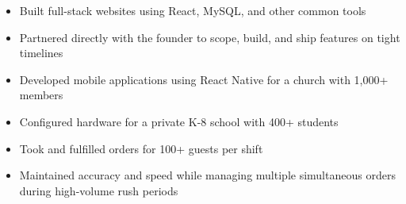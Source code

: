 \begin{itemize}
  \item Built full-stack websites using React, MySQL, and other common tools
  \item Partnered directly with the founder to scope, build, and ship features on tight timelines
\end{itemize}

\begin{itemize}
  \item Developed mobile applications using React Native for a church with 1,000+ members
  \item Configured hardware for a private K-8 school with 400+ students
\end{itemize}

\begin{itemize}
  \item Took and fulfilled orders for 100+ guests per shift
  \item Maintained accuracy and speed while managing multiple simultaneous orders during high-volume rush periods
\end{itemize}
